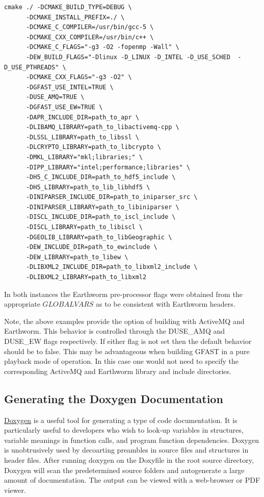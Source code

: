 \documentclass[12pt]{article}
\begin{document}
\begin{verbatim}
cmake ./ -DCMAKE_BUILD_TYPE=DEBUG \
      -DCMAKE_INSTALL_PREFIX=./ \
      -DCMAKE_C_COMPILER=/usr/bin/gcc-5 \
      -DCMAKE_CXX_COMPILER=/usr/bin/c++ \
      -DCMAKE_C_FLAGS="-g3 -O2 -fopenmp -Wall" \
      -DEW_BUILD_FLAGS="-Dlinux -D_LINUX -D_INTEL -D_USE_SCHED  -D_USE_PTHREADS" \
      -DCMAKE_CXX_FLAGS="-g3 -O2" \
      -DGFAST_USE_INTEL=TRUE \
      -DUSE_AMQ=TRUE \
      -DGFAST_USE_EW=TRUE \      
      -DAPR_INCLUDE_DIR=path_to_apr \
      -DLIBAMQ_LIBRARY=path_to_libactivemq-cpp \
      -DLSSL_LIBRARY=path_to_libssl \
      -DLCRYPTO_LIBRARY=path_to_libcrypto \
      -DMKL_LIBRARY="mkl;libraries;" \
      -DIPP_LIBRARY="intel;performance;libraries" \
      -DH5_C_INCLUDE_DIR=path_to_hdf5_include \
      -DH5_LIBRARY=path_to_lib_libhdf5 \
      -DINIPARSER_INCLUDE_DIR=path_to_iniparser_src \
      -DINIPARSER_LIBRARY=path_to_libiniparser \
      -DISCL_INCLUDE_DIR=path_to_iscl_include \
      -DISCL_LIBRARY=path_to_libiscl \
      -DGEOLIB_LIBRARY=path_to_libGeographic \
      -DEW_INCLUDE_DIR=path_to_ewinclude \
      -DEW_LIBRARY=path_to_libew \
      -DLIBXML2_INCLUDE_DIR=path_to_libxml2_include \
      -DLIBXML2_LIBRARY=path_to_libxml2
\end{verbatim}
In both instances the Earthworm pre-processor flags were obtained from the appropriate
${GLOBALVARS}$ as to be consistent with Earthworm headers. 

Note, the above examples provide the option of building with ActiveMQ and Earthworm.  This
behavior is controlled through the DUSE\_AMQ and DUSE\_EW flags respectively.  If either flag
is not set then the default behavior should be to false.  This may be advantageous when
building GFAST in a pure playback mode of operation.  In this case one would not need to 
specify the corresponding ActiveMQ and Earthworm library and include directories.  

\subsection{Generating the Doxygen Documentation}
\href{http://www.stack.nl/~dimitri/doxygen/}{Doxygen}
is a useful tool for generating a type of code documentation.  It is particularly
useful to developers who wish to look-up variables in structures, variable meanings in 
function calls, and program function dependencies.  Doxygen is unobtrusively used by
decoarting preambles in source files and structures in header files.  After running
doxygen on the Doxyfile in the root source directory, Doxygen will scan the predetermined
source folders and autogenerate a large amount of documentation.  The output can be viewed
with a web-browser or PDF viewer.  
\end{document}
